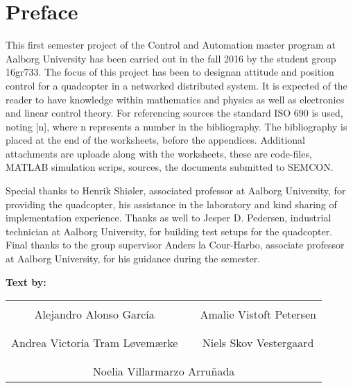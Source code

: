 
\chapter*{Preface}
This first semester project of the Control and Automation master program at Aalborg University has been carried out in the fall 2016 by the student group 16gr733. 
The focus of this project has been to designan attitude and position control for a quadcopter in a networked distributed system. 
It is expected of the reader to have knowledge within mathematics and physics as well as electronics and linear control theory.
For referencing sources the standard ISO 690 is used, noting [n], where n represents a number in the bibliography. The bibliography is placed at the end of the worksheets, before the appendices. Additional attachments are uploade along with the worksheets, these are code-files, MATLAB simulation scrips, sources, the documents submitted to SEMCON.

Special thanks to Henrik Shiøler, associated professor at Aalborg University, for providing the quadcopter, his assistance in the laboratory and kind sharing of implementation experience. Thanks as well to Jesper D. Pedersen, industrial technician at Aalborg University, for building test setups for the quadcopter. Final thanks to the group supervisor Anders la Cour-Harbo, associate professor at Aalborg University, for his guidance during the semester.

%
%


\textbf{Text by:}\\
\vspace{-5pt}
\begin{table}[H]
	\centering
		\begin{tabular}{c c c}
			\underline{\phantom{JAERJAERJAERJAERGO}} & \phantom{cookies} & \underline{\phantom{JAERJAERJAERJAERGO}} \\
			Alejandro Alonso García			& \phantom{cookies} & Amalie Vistoft Petersen		\\
			&&\\
			\underline{\phantom{JAERJAERJAERJAERGO}} & \phantom{cookies} & \underline{\phantom{JAERJAERJAERJAERGO}} \\
			Andrea Victoria Tram Løvemærke			& \phantom{cookies} & Niels Skov Vestergaard		\\
			&&\\
	    \multicolumn{3}{c}{\underline{\phantom{JAERJAERJAERJAERGO}}}\\
	    \multicolumn{3}{c}{Noelia Villarmarzo Arruñada}\\				
		\end{tabular}
\end{table}

\pagebreak
\restoregeometry